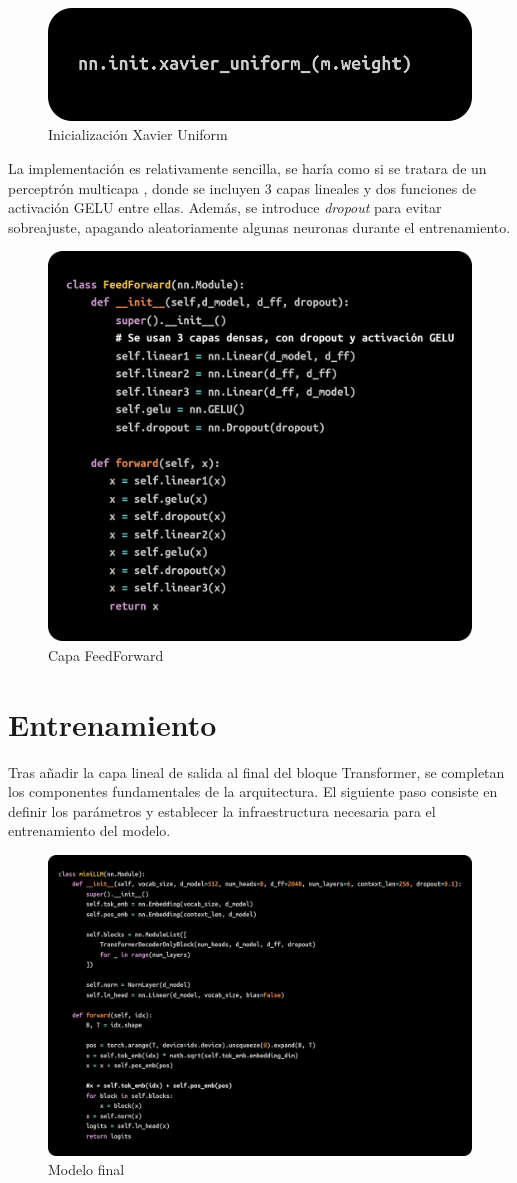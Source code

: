 \documentclass[11pt]{book}
\begin{document}
\begin{figure}[h]
    \centering
    \includegraphics[width=0.5\linewidth]{img/xavier_init.png}
    \caption{Inicialización Xavier Uniform}
    \label{fig:placeholder15}
\end{figure}

La implementación es relativamente sencilla, se haría como si se tratara de un perceptrón multicapa \parencite{kyeg_feedforward_demystified}, donde se incluyen 3 capas lineales y dos funciones de activación GELU entre ellas. Además, se introduce \textit{dropout} para evitar sobreajuste, apagando aleatoriamente algunas neuronas durante el entrenamiento.

\begin{figure}[h]
    \centering
    \includegraphics[width=0.5\linewidth]{img/ffnn.png}
    \caption{Capa FeedForward}
    \label{fig:placeholder16}
\end{figure}



\section{Entrenamiento}

Tras añadir la capa lineal de salida al final del bloque Transformer, se completan los componentes fundamentales de la arquitectura. El siguiente paso consiste en definir los parámetros y establecer la infraestructura necesaria para el entrenamiento del modelo.

\begin{figure}[h]
    \centering
    \includegraphics[width=0.5\linewidth]{img/gpt2.png}
    \caption{Modelo final}
    \label{fig:placeholder19}
\end{figure}
\end{document}
